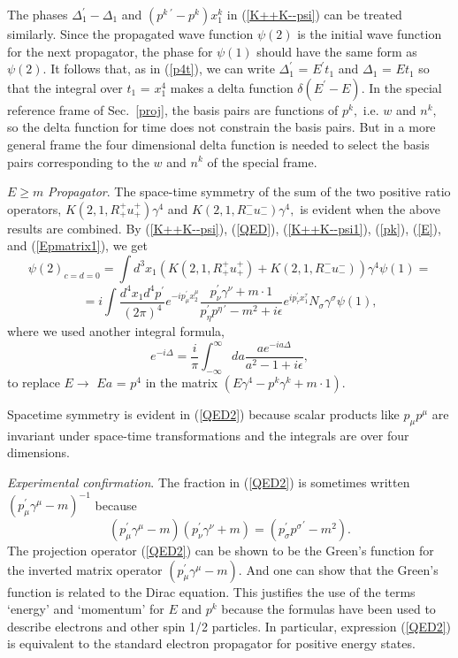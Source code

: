\documentclass[a4paper,12pt]{article}
\begin{document}
	The phases $\Delta_{1}^{\prime}- \Delta_{1}$ and $(p^{k \; \prime} - p^{k})x_{1}^{k}$ in (\ref{K++K--psi}) can be treated similarly. Since the propagated wave function $\psi(2)$ is the initial wave function for the next propagator, the phase for $\psi(1)$ should have the same form as $\psi(2).$ It follows that, as in (\ref{p4t}), we can write $\Delta_{1}^{\prime}$ = $E^{\prime} t_{1}$ and $\Delta_{1}$ = $E t_{1}$ so that the integral over $t_{1}$ = $x_{1}^{4}$ makes a delta function $\delta(E^{\prime}- E).$ In the special reference frame of Sec.~\ref{proj}, the basis pairs are functions of $p^{k},$ i.e. $w$ and $n^{k},$ so the delta function for time does not constrain the basis pairs. But in a more general frame the four dimensional delta function is needed to select the basis pairs corresponding to the $w$ and $n^{k}$ of the special frame.

	$E \geq m$ {\textit{Propagator}}. The space-time symmetry of the sum of the two positive ratio operators, $K(2,1,R_{+}^{+} u_{+}^{+}) \gamma^{4}$ and $K(2,1,R_{-}^{-} u_{-}^{-}) \gamma^{4},$ is evident when the above results are combined. By (\ref{K++K--psi}), (\ref{QED}), (\ref{K++K--psi1}), (\ref{pk}), (\ref{E}), and (\ref{Epmatrix1}), we get
\begin{equation}	\label{QED2}
\psi(2)_{c=d=0} = \int d^3x_{1}(K(2,1,R_{+}^{+}u_{+}^{+}) + K(2,1,R_{-}^{-}u_{-}^{-})) \gamma^{4} \psi(1) =
\end{equation}
$$ = i\int \frac{d^4 x_{1} d^4 p^{\prime} }{(2 \pi)^4} e^{-ip_{\mu}^{\prime}x_{2}^{\mu}}  \frac{ p_{\nu}^{\prime} \gamma^{\nu} + m \cdot 1}{p_{\eta}^{\prime}p^{\eta \, \prime}  - m^2 + i\epsilon} e^{ i p_{\tau}^{\prime} x_{1}^{\tau}} N_{\sigma} \gamma^{\sigma} \psi(1),$$
where we used another integral formula,
\begin{equation} \label{expiDelta2}	%
e^{-i \Delta} =  \frac{i}{ \pi} \int_{-\infty}^{\infty} da \frac{ae^{-ia\Delta}}{a^2-1+i\epsilon},
\end{equation}
 to replace $E \rightarrow$ $Ea$ = $p^{4}$ in the matrix $(E \gamma^{4} - p^{k} \gamma^{k} + m \cdot 1).$ 

	Spacetime symmetry is evident in (\ref{QED2}) because scalar products like $p_{\mu}p^{\mu }$ are invariant under space-time transformations and the integrals are over four dimensions.

	{\textit{Experimental confirmation}}. The fraction in (\ref{QED2}) is sometimes written $(p_{\mu}^{\prime} \gamma^{\mu} - m)^{-1}$ because
\begin{equation}	\label{m-1}
(p_{\mu}^{\prime} \gamma^{\mu} - m)(p_{\nu}^{\prime} \gamma^{\nu} + m) = (p_{\sigma}^{\prime} {p^{\sigma}}^{\prime}- m^2) .
\end{equation}
The projection operator (\ref{QED2}) can be shown to be the Green's function for the inverted matrix operator $(p_{\mu}^{\prime} \gamma^{\mu} - m).$ \cite{bjorken} And one can show that the Green's function is related to the Dirac equation. This justifies the use of the terms `energy' and `momentum' for $E$ and $p^{k}$ because the formulas have been used to describe electrons and other spin 1/2 particles. In particular, expression (\ref{QED2}) is equivalent to the standard electron propagator for positive energy states.
\end{document}
